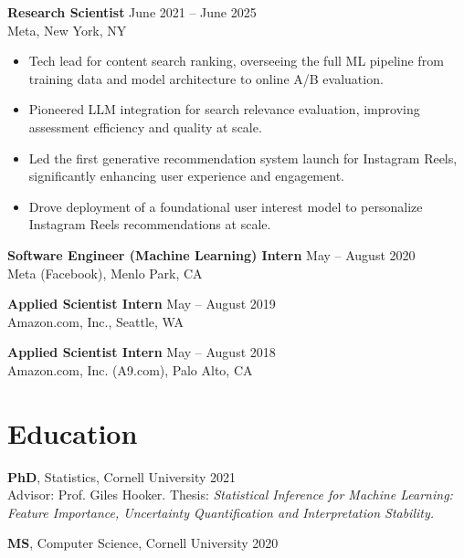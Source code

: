 \documentclass{article}
\begin{document}
\vspace{1mm}

\noindent\textbf{Research Scientist} \hfill June 2021 -- June 2025 \\
Meta, New York, NY

\begin{itemize}
  \item Tech lead for content search ranking, overseeing the full ML pipeline from
        training data and model architecture to online A/B evaluation.
  \item Pioneered LLM integration for search relevance evaluation, improving assessment
        efficiency and quality at scale.
  \item Led the first generative recommendation system launch for Instagram Reels,
        significantly enhancing user experience and engagement.
  \item Drove deployment of a foundational user interest model to personalize
        Instagram Reels recommendations at scale.
\end{itemize}

\vspace{1mm}

\noindent\textbf{Software Engineer (Machine Learning) Intern} \hfill May -- August 2020 \\
\noindent Meta (Facebook), Menlo Park, CA

\noindent\textbf{Applied Scientist Intern} \hfill May -- August 2019 \\
\noindent Amazon.com, Inc., Seattle, WA

\noindent\textbf{Applied Scientist Intern} \hfill May -- August 2018 \\
\noindent Amazon.com, Inc. (A9.com), Palo Alto, CA

\section*{Education}

\noindent\textbf{PhD}, Statistics, Cornell University \hfill 2021 \\
Advisor: Prof. Giles Hooker. Thesis: \textit{Statistical Inference for Machine Learning:
Feature Importance, Uncertainty Quantification and Interpretation Stability.}

\vspace{1mm}

\noindent\textbf{MS}, Computer Science, Cornell University \hfill 2020
\end{document}
